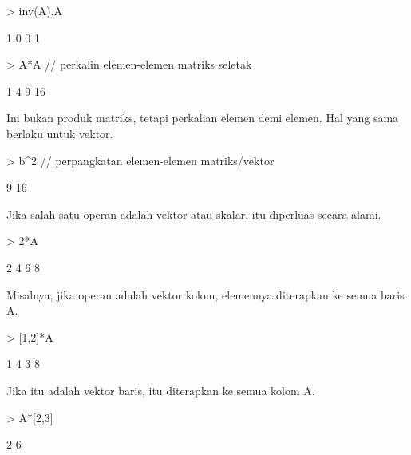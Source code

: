 \documentclass[a4paper,10pt]{article}
\begin{document}
\begin{eulernotebook}
\begin{eulercomment}
\begin{eulercomment}
\begin{eulercomment}
\begin{eulercomment}
\begin{eulercomment}
\begin{eulercomment}
\begin{eulerprompt}
> inv(A).A
\end{eulerprompt}
\begin{euleroutput}
              1             0 
              0             1 
\end{euleroutput}
\begin{eulerprompt}
> A*A // perkalin elemen-elemen matriks seletak
\end{eulerprompt}
\begin{euleroutput}
              1             4 
              9            16 
\end{euleroutput}
\begin{eulercomment}
Ini bukan produk matriks, tetapi perkalian elemen demi elemen. Hal
yang sama berlaku untuk vektor.
\end{eulercomment}
\begin{eulerprompt}
> b^2 // perpangkatan elemen-elemen matriks/vektor
\end{eulerprompt}
\begin{euleroutput}
              9 
             16 
\end{euleroutput}
\begin{eulercomment}
Jika salah satu operan adalah vektor atau skalar, itu diperluas secara
alami.
\end{eulercomment}
\begin{eulerprompt}
> 2*A
\end{eulerprompt}
\begin{euleroutput}
              2             4 
              6             8 
\end{euleroutput}
\begin{eulercomment}
Misalnya, jika operan adalah vektor kolom, elemennya diterapkan ke
semua baris A.
\end{eulercomment}
\begin{eulerprompt}
> [1,2]*A
\end{eulerprompt}
\begin{euleroutput}
              1             4 
              3             8 
\end{euleroutput}
\begin{eulercomment}
Jika itu adalah vektor baris, itu diterapkan ke semua kolom A.
\end{eulercomment}
\begin{eulerprompt}
> A*[2,3]
\end{eulerprompt}
\begin{euleroutput}
              2             6 

\end{euleroutput}
\end{eulercomment}
\end{eulercomment}
\end{eulercomment}
\end{eulercomment}
\end{eulercomment}
\end{eulercomment}
\end{eulernotebook}
\end{document}
